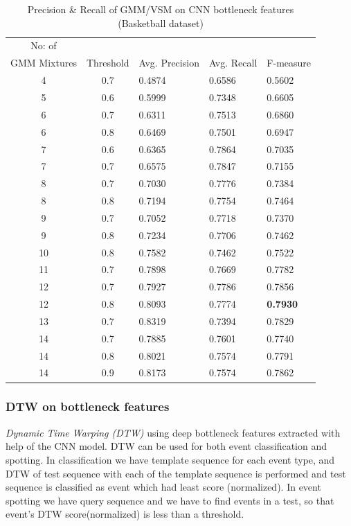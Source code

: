 \begin{table}[h]
\centering
\begin{tabular}{|c|c|l|l|l|}
\hline
No: of &&&&\\
GMM Mixtures & Threshold & Avg. Precision & Avg. Recall & F-measure\\
\hline
\hline
4 	&0.7 	&0.4874 	& 0.6586	&0.5602\\
5 	&0.6 	&0.5999 	& 0.7348	&0.6605\\
6 	&0.7 	&0.6311 	& 0.7513	&0.6860\\
6 	&0.8 	&0.6469 	& 0.7501	&0.6947\\
7 	&0.6 	&0.6365 	& 0.7864	&0.7035\\
7 	&0.7 	&0.6575 	& 0.7847	&0.7155\\
8 	&0.7 	&0.7030 	& 0.7776	&0.7384\\
8 	&0.8 	&0.7194 	& 0.7754	&0.7464\\
9 	&0.7 	&0.7052 	& 0.7718	&0.7370\\
9 	&0.8 	&0.7234 	& 0.7706	&0.7462\\
10 	&0.8 	&0.7582 	& 0.7462	&0.7522\\
11 	&0.7 	&0.7898 	& 0.7669	&0.7782\\
12 	&0.7 	&0.7927 	& 0.7786	&0.7856\\
12 	&0.8 	&0.8093 	& 0.7774	&\textbf{0.7930}\\
13 	&0.7 	&0.8319 	& 0.7394	&0.7829\\
14 	&0.7 	&0.7885 	& 0.7601	&0.7740\\
14 	&0.8 	&0.8021 	& 0.7574	&0.7791\\
14 	&0.9 	&0.8173 	& 0.7574	&0.7862\\
\hline  
\end{tabular}
\caption[Event spotting using GMM/VSM on CNN(Gray,Frame diff,Edge) bottleneck features (MSR Action Dataset) ]{ Precision \& Recall  of GMM/VSM on CNN bottleneck features (Basketball dataset)}
\label{table:cnn_gmm_res_basket}
\end{table}

\subsubsection{DTW on bottleneck features}
\textit{Dynamic Time Warping (DTW)} using deep bottleneck features extracted with help of the CNN model. DTW can be used for both event classification and spotting. In classification we have template sequence for each event type, and DTW of test sequence with each of the template sequence is performed and test sequence is classified as event which had least score (normalized). In event spotting we have query sequence and we have to find events in a test, so that event's DTW score(normalized) is less than a threshold.


